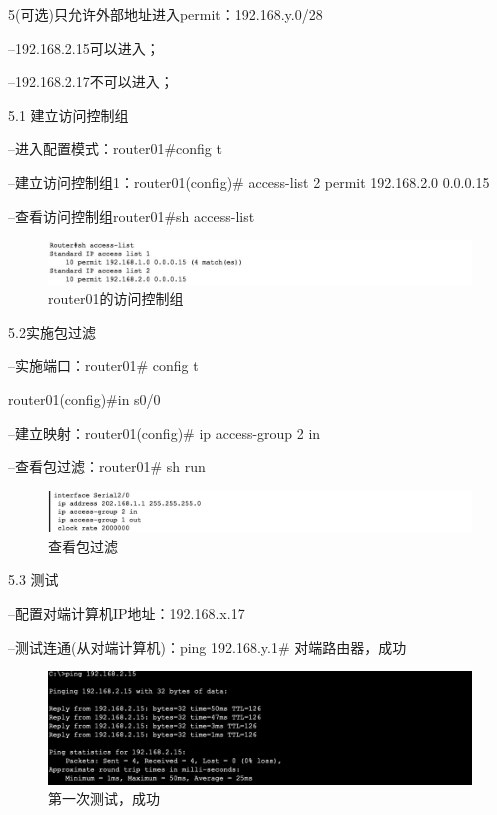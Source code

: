 \documentclass[lang=cn,11pt,a4paper,cite=authoryear]{elegantpaper}
\begin{document}
5(可选)只允许外部地址进入permit：192.168.y.0/28

--192.168.2.15可以进入；

--192.168.2.17不可以进入；

5.1 建立访问控制组

--进入配置模式：router01\#config t

--建立访问控制组1：router01(config)\# access-list 2 permit 192.168.2.0  0.0.0.15 

--查看访问控制组router01\#sh access-list

\begin{figure}[htbp]
	\centering
	\includegraphics[width=0.7\linewidth]{image/screenshot039}
	\caption{router01的访问控制组}
	\label{fig:screenshot039}
\end{figure}


5.2实施包过滤

--实施端口：router01\# config t

router01(config)\#in s0/0

--建立映射：router01(config)\# ip access-group 2 in 

--查看包过滤：router01\# sh run

\begin{figure}[htbp]
	\centering
	\includegraphics[width=0.7\linewidth]{image/screenshot040}
	\caption{查看包过滤}
	\label{fig:screenshot040}
\end{figure}


5.3 测试

--配置对端计算机IP地址：192.168.x.17

--测试连通(从对端计算机)：ping 192.168.y.1\# 对端路由器，成功


\begin{figure}[htbp]
	\centering
	\includegraphics[width=0.7\linewidth]{image/screenshot041}
	\caption{第一次测试，成功}
	\label{fig:screenshot041}
\end{figure}
\end{document}
